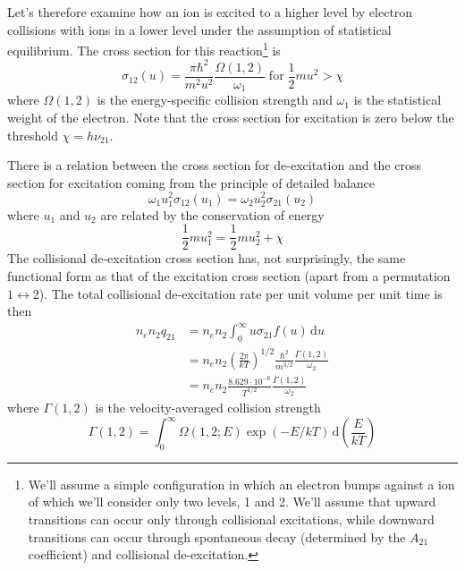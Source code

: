 \par Let's therefore examine how an ion is excited to a higher level by electron collisions with ions in a lower level under the assumption of statistical equilibrium. The cross section for this reaction\footnote{We'll assume a simple configuration in which an electron bumps against a ion of which we'll consider only two levels, 1 and 2. We'll assume that upward transitions can occur only through collisional excitations, while downward transitions can occur through spontaneous decay (determined by the $A_{21}$ coefficient) and collisional de-excitation.} is 
\begin{equation*}
    \sigma_{12}(u) = \frac{\pi\hbar^{2}}{m^{2}u^{2}}\frac{\Omega(1,2)}{\omega_{1}} \;\text{for}\;\frac{1}{2}mu^{2} > \chi
\end{equation*}
where $\Omega(1,2)$ is the energy-specific collision strength and $\omega_{1}$ is the statistical weight of the electron. Note that the cross section for excitation is zero below the threshold $\chi = h\nu_{21}$.
\par There is a relation between the cross section for de-excitation and the cross section for excitation coming from the principle of detailed balance
\begin{equation*}
    \omega_{1}u_{1}^{2}\sigma_{12}(u_{1}) = \omega_{2}u_{2}^{2}\sigma_{21}(u_{2})
\end{equation*}
where $u_{1}$ and $u_{2}$ are related by the conservation of energy
\begin{equation*}
    \frac{1}{2}mu_{1}^{2} = \frac{1}{2}mu_{2}^{2}+\chi
\end{equation*}
The collisional de-excitation cross section has, not surprisingly, the same functional form as that of the excitation cross section (apart from a permutation $1\leftrightarrow 2$). The total collisional de-excitation rate per unit volume per unit time is then 
\begin{align}
    n_{e}n_{2}q_{21} &= n_{e}n_{2}\int_{0}^{\infty} u\sigma_{21}f(u)\,\text{d}u \\
    &= n_{e}n_{2}\left(\frac{2\pi}{kT}\right)^{1/2}\frac{\hbar^{2}}{m^{3/2}}\frac{\Gamma(1,2)}{\omega_{2}}\\
    &= n_{e}n_{2}\frac{8.629\cdot 10^{-6}}{T^{1/2}}\frac{\Gamma(1,2)}{\omega_{2}}
    \label{eq:total_de-ex}
\end{align}
where $\Gamma(1,2)$ is the velocity-averaged collision strength
\begin{equation*}
    \Gamma(1,2) = \int_{0}^{\infty} \Omega(1,2; E)\exp(-E/kT)\, \text{d}\left(\frac{E}{kT}\right)
\end{equation*}
